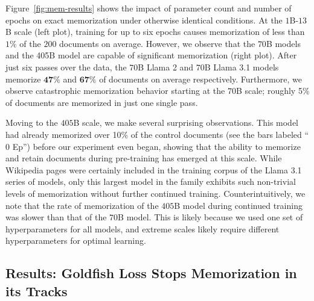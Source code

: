 
Figure~\ref{fig:mem-results} shows the impact of parameter count and number of
epochs on exact memorization under otherwise identical conditions. At the
$1$B-$13$B scale (left plot), training for up to six epochs causes memorization of less
than $1\%$ of the $200$ documents on average. However, we observe that the $70$B
models and the 405B model are capable of significant memorization (right plot). After just six passes over the
data, the $70$B Llama 2 and $70$B Llama 3.1 models memorize $\mathbf{47\%}$ and
$\mathbf{67\%}$ of documents on average respectively. Furthermore, we observe
catastrophic memorization behavior starting at the $70$B scale; roughly 5\% of
documents are memorized in just one single pass.

Moving to the $405$B scale, we make several surprising observations. This model
had already memorized over 10\% of the control documents (see the bars labeled
``$0$ Ep'') before our experiment even began, showing that the ability to
memorize and retain documents during pre-training has emerged at this scale.
While Wikipedia pages were certainly included in the training corpus of the
Llama 3.1 series of models, only this largest model in the family exhibits such
non-trivial levels of memorization without further continued training.
Counterintuitively, we note that the rate of memorization of the $405$B model
during continued training was slower than that of the $70$B model. This is
likely because we used one set of hyperparameters for all models, and extreme
scales likely require different hyperparameters for optimal learning.



\subsection{Results: Goldfish Loss Stops Memorization in its Tracks}

